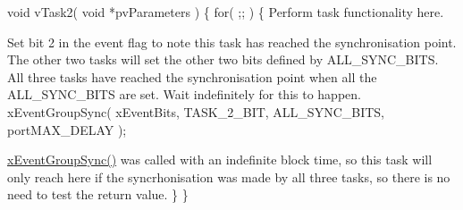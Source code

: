 \begin{DoxyPre} void vTask2( void *pvParameters )
 \{
     for( ;; )
     \{
Perform task functionality here.\end{DoxyPre}



\begin{DoxyPre}Set bit 2 in the event flag to note this task has reached the
synchronisation point.  The other two tasks will set the other two
bits defined by ALL\_SYNC\_BITS.  All three tasks have reached the
synchronisation point when all the ALL\_SYNC\_BITS are set.  Wait
indefinitely for this to happen.
        xEventGroupSync( xEventBits, TASK\_2\_BIT, ALL\_SYNC\_BITS, portMAX\_DELAY );\end{DoxyPre}



\begin{DoxyPre}\hyperlink{event__groups_8h_a869511456b86426f52e2eec898bff341}{xEventGroupSync()} was called with an indefinite block time, so
this task will only reach here if the syncrhonisation was made by all
three tasks, so there is no need to test the return value.
    \}
 \}\end{DoxyPre}



\begin{DoxyPre} \end{DoxyPre}
 